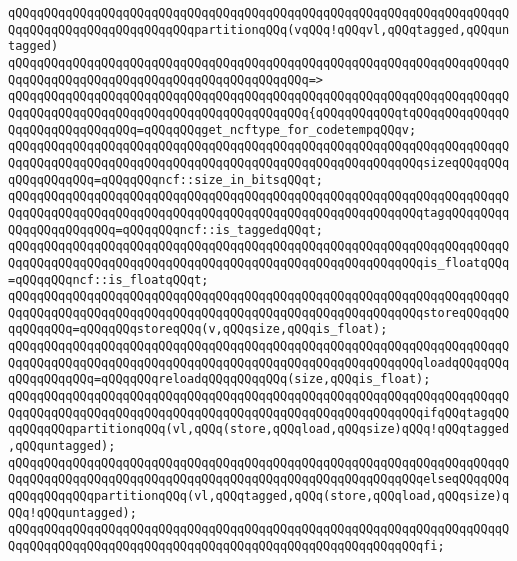 \newline
\verb|qQQqqQQqqQQqqQQqqQQqqQQqqQQqqQQqqQQqqQQqqQQqqQQqqQQqqQQqqQQqqQQqqQQqqQQqqQQqqQQqqQQqqQQqqQQqqQQqpartitionqQQq(vqQQq!qQQqvl,qQQqtagged,qQQquntagged)|\newline
\verb|qQQqqQQqqQQqqQQqqQQqqQQqqQQqqQQqqQQqqQQqqQQqqQQqqQQqqQQqqQQqqQQqqQQqqQQqqQQqqQQqqQQqqQQqqQQqqQQqqQQqqQQqqQQqqQQq=>|\newline
\verb|qQQqqQQqqQQqqQQqqQQqqQQqqQQqqQQqqQQqqQQqqQQqqQQqqQQqqQQqqQQqqQQqqQQqqQQqqQQqqQQqqQQqqQQqqQQqqQQqqQQqqQQqqQQqqQQq{qQQqqQQqqQQqtqQQqqQQqqQQqqQQqqQQqqQQqqQQqqQQq=qQQqqQQqget_ncftype_for_codetempqQQqv;|\newline
\verb|qQQqqQQqqQQqqQQqqQQqqQQqqQQqqQQqqQQqqQQqqQQqqQQqqQQqqQQqqQQqqQQqqQQqqQQqqQQqqQQqqQQqqQQqqQQqqQQqqQQqqQQqqQQqqQQqqQQqqQQqqQQqqQQqsizeqQQqqQQqqQQqqQQqqQQq=qQQqqQQqncf::size_in_bitsqQQqt;|\newline
\verb|qQQqqQQqqQQqqQQqqQQqqQQqqQQqqQQqqQQqqQQqqQQqqQQqqQQqqQQqqQQqqQQqqQQqqQQqqQQqqQQqqQQqqQQqqQQqqQQqqQQqqQQqqQQqqQQqqQQqqQQqqQQqqQQqtagqQQqqQQqqQQqqQQqqQQqqQQq=qQQqqQQqncf::is_taggedqQQqt;|\newline
\verb|qQQqqQQqqQQqqQQqqQQqqQQqqQQqqQQqqQQqqQQqqQQqqQQqqQQqqQQqqQQqqQQqqQQqqQQqqQQqqQQqqQQqqQQqqQQqqQQqqQQqqQQqqQQqqQQqqQQqqQQqqQQqqQQqis_floatqQQq=qQQqqQQqncf::is_floatqQQqt;|\newline
\verb|qQQqqQQqqQQqqQQqqQQqqQQqqQQqqQQqqQQqqQQqqQQqqQQqqQQqqQQqqQQqqQQqqQQqqQQqqQQqqQQqqQQqqQQqqQQqqQQqqQQqqQQqqQQqqQQqqQQqqQQqqQQqqQQqstoreqQQqqQQqqQQqqQQq=qQQqqQQqstoreqQQq(v,qQQqsize,qQQqis_float);|\newline
\verb|qQQqqQQqqQQqqQQqqQQqqQQqqQQqqQQqqQQqqQQqqQQqqQQqqQQqqQQqqQQqqQQqqQQqqQQqqQQqqQQqqQQqqQQqqQQqqQQqqQQqqQQqqQQqqQQqqQQqqQQqqQQqqQQqloadqQQqqQQqqQQqqQQqqQQq=qQQqqQQqreloadqQQqqQQqqQQq(size,qQQqis_float);|\newline
\newline
\verb|qQQqqQQqqQQqqQQqqQQqqQQqqQQqqQQqqQQqqQQqqQQqqQQqqQQqqQQqqQQqqQQqqQQqqQQqqQQqqQQqqQQqqQQqqQQqqQQqqQQqqQQqqQQqqQQqqQQqqQQqqQQqqQQqifqQQqtagqQQqqQQqqQQqpartitionqQQq(vl,qQQq(store,qQQqload,qQQqsize)qQQq!qQQqtagged,qQQquntagged);|\newline
\verb|qQQqqQQqqQQqqQQqqQQqqQQqqQQqqQQqqQQqqQQqqQQqqQQqqQQqqQQqqQQqqQQqqQQqqQQqqQQqqQQqqQQqqQQqqQQqqQQqqQQqqQQqqQQqqQQqqQQqqQQqqQQqqQQqelseqQQqqQQqqQQqqQQqqQQqpartitionqQQq(vl,qQQqtagged,qQQq(store,qQQqload,qQQqsize)qQQq!qQQquntagged);|\newline
\verb|qQQqqQQqqQQqqQQqqQQqqQQqqQQqqQQqqQQqqQQqqQQqqQQqqQQqqQQqqQQqqQQqqQQqqQQqqQQqqQQqqQQqqQQqqQQqqQQqqQQqqQQqqQQqqQQqqQQqqQQqqQQqqQQqfi;|\newline
